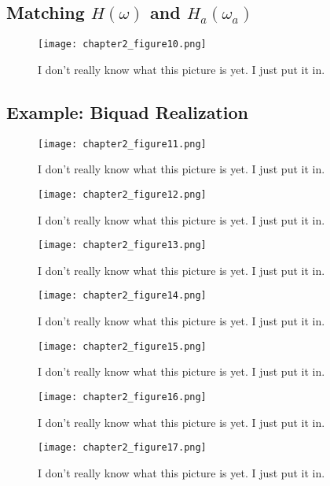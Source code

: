 \documentclass[11pt,fleqn]{book} %
\begin{document}
\begin{enumerate}
\section{Matching $H(\omega)$ and $H_a(\omega_a)$}

\begin{figure}[h]
  \centering\texttt{[image: chapter2\_figure10.png]}
  \caption{I don't really know what this picture is yet. I just put it in.}
\end{figure}

\subsection{Example: Biquad Realization}

\begin{figure}[h]
  \centering\texttt{[image: chapter2\_figure11.png]}
  \caption{I don't really know what this picture is yet. I just put it in.}
\end{figure}

\begin{figure}[h]
  \centering\texttt{[image: chapter2\_figure12.png]}
  \caption{I don't really know what this picture is yet. I just put it in.}
\end{figure}
\begin{figure}[h]
  \centering\texttt{[image: chapter2\_figure13.png]}
  \caption{I don't really know what this picture is yet. I just put it in.}
\end{figure}
\begin{figure}[h]
  \centering\texttt{[image: chapter2\_figure14.png]}
  \caption{I don't really know what this picture is yet. I just put it in.}
\end{figure}
\begin{figure}[h]
  \centering\texttt{[image: chapter2\_figure15.png]}
  \caption{I don't really know what this picture is yet. I just put it in.}
\end{figure}
\begin{figure}[h]
  \centering\texttt{[image: chapter2\_figure16.png]}
  \caption{I don't really know what this picture is yet. I just put it in.}
\end{figure}

\begin{figure}[h]
  \centering\texttt{[image: chapter2\_figure17.png]}
  \caption{I don't really know what this picture is yet. I just put it in.}
\end{figure}


\end{enumerate}
\end{document}
